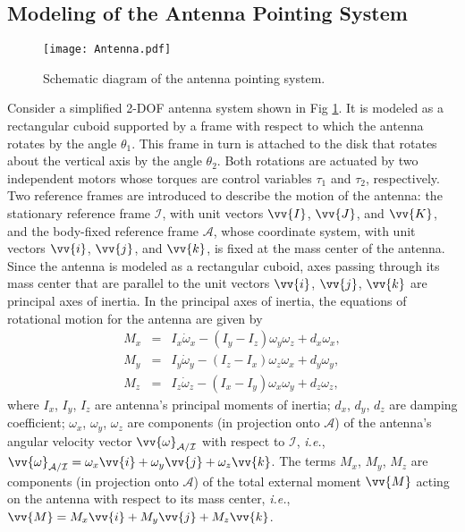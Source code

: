 \documentclass{ifacconf}
\begin{document}
\subsection{Modeling of the Antenna Pointing System} 

\begin{figure}[t]
\begin{center}
\texttt{[image: Antenna.pdf]}    %
\caption{Schematic diagram of the antenna pointing system.} 
\label{fig:antenna}
\end{center}
\end{figure}


Consider a simplified 2-DOF antenna system shown in Fig \ref{fig:antenna}. It is modeled as a rectangular cuboid supported by a frame with respect to which the antenna rotates by the angle $\theta_1$. This frame in turn is attached to the disk that rotates about the vertical axis by the angle $\theta_2$. Both rotations are actuated by two independent motors whose torques are control variables $\tau_1$ and $\tau_2$, respectively. Two reference frames are introduced to describe the motion of the antenna: the stationary reference frame $\mathcal{I}$, with unit vectors $\vv{I}$, $\vv{J}$, and $\vv{K}$, and the body-fixed reference frame $\mathcal{A}$, whose coordinate system, with unit vectors $\vv{i}$, $\vv{j}$, and $\vv{k}$, is fixed at the mass center of the antenna. Since the antenna is modeled as a rectangular cuboid, axes passing through its mass center that are parallel to the unit vectors $\vv{i}$, $\vv{j}$, $\vv{k}$ are principal axes of inertia. In the principal axes of inertia, the equations of rotational motion for the antenna are given by \vspace{-0.3cm}
\begin{subequations}\label{eqnmotion}
    \begin{eqnarray}
    M_{x}&=&I_x\dot{\omega}_{x}-(I_y-I_z)\omega_y\omega_z+d_x\omega_x,\\
    M_{y}&=&I_y\dot{\omega}_{y}-(I_z-I_x)\omega_z\omega_x+d_y\omega_y,\\
    M_{z}&=&I_z\dot{\omega}_{z}-(I_x-I_y)\omega_x\omega_y+d_z\omega_z,
    \end{eqnarray}
\end{subequations}
where $I_x$, $I_y$, $I_z$ are antenna's principal moments of inertia; $d_x$, $d_y$, $d_z$ are damping coefficient; $\omega_{x}$, $\omega_{y}$, $\omega_{z}$ are components (in projection onto $\mathcal{A}$) of the antenna's angular velocity vector $\vv{\omega}_{\mathcal{A}/\mathcal{I}}$ with respect to $\mathcal{I}$, \textit{i.e.}, $\vv{\omega}_{\mathcal{A}/\mathcal{I}}=\omega_x\vv{i}+\omega_{y}\vv{j}+\omega_{z}\vv{k}$. The terms $M_x$, $M_y$, $M_z$ are components (in projection onto $\mathcal{A}$) of the total external moment $\vv{M}$ acting on the antenna with respect to its mass center, \textit{i.e.}, $\vv{M}=M_x\vv{i}+M_y\vv{j}+M_{z}\vv{k}$. 
\end{document}
